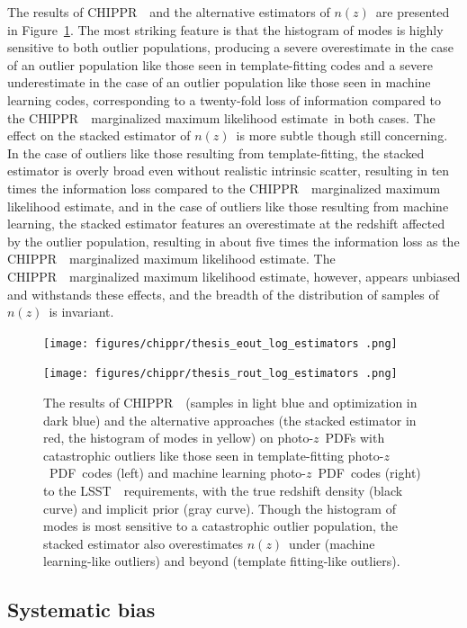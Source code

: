 \documentclass[iop]{emulateapj}
\newcommand{\Fig}[1]{Figure~\ref{#1}}
\newcommand{\project}[1]{{\textsc{#1}}~}
\newcommand{\lsst}{\project{LSST}}
\newcommand{\Chippr}{\project{CHIPPR}}
\newcommand{\nz}{$n(z)$}
\newcommand{\pz}{photo-$z$~}
\newcommand{\pzpdf}{\pz PDF}
\newcommand{\mmle}{marginalized maximum likelihood estimate}
\begin{document}
The results of \Chippr\ and the alternative estimators of \nz\ are presented in 
\Fig{fig:nonuniform-outliers-results}.
The most striking feature is that the histogram of modes is highly sensitive to 
both outlier populations, producing a severe overestimate in the case of an 
outlier population like those seen in template-fitting codes and a severe 
underestimate in the case of an outlier population like those seen in machine 
learning codes, corresponding to a twenty-fold loss of information compared to 
the \Chippr\ \mmle\ in both cases.
The effect on the stacked estimator of \nz\ is more subtle though still 
concerning.
In the case of outliers like those resulting from template-fitting, the stacked 
estimator is overly broad even without realistic intrinsic scatter, resulting 
in ten times the information loss compared to the \Chippr\ \mmle, and in the 
case of outliers like those resulting from machine learning, the stacked 
estimator features an overestimate at the redshift affected by the outlier 
population, resulting in about five times the information loss as the \Chippr\ 
\mmle.
The \Chippr\ \mmle, however, appears unbiased and withstands these effects, and 
the breadth of the distribution of samples of \nz\ is invariant.

\begin{figure}
	
\texttt{[image: figures/chippr/thesis\_eout\_log\_estimators
.png]}
	
\texttt{[image: figures/chippr/thesis\_rout\_log\_estimators
.png]}
	\caption{
		The results of \Chippr\ (samples in light blue and optimization 
in dark blue) and the alternative approaches (the stacked estimator in red, the 
histogram of modes in yellow) on \pzpdf s with catastrophic outliers like those 
seen in template-fitting \pzpdf\ codes (left) and machine learning \pzpdf\ 
codes (right) to the \lsst\ requirements, with the true redshift density (black 
curve) and implicit prior (gray curve).
		Though the histogram of modes is most sensitive to a 
catastrophic outlier population, the stacked estimator also overestimates \nz\ 
under (machine learning-like outliers) and beyond (template fitting-like 
outliers).
	}
	\label{fig:nonuniform-outliers-results}
\end{figure}

\subsection{Systematic bias}
\label{sec:bias}
\end{document}
